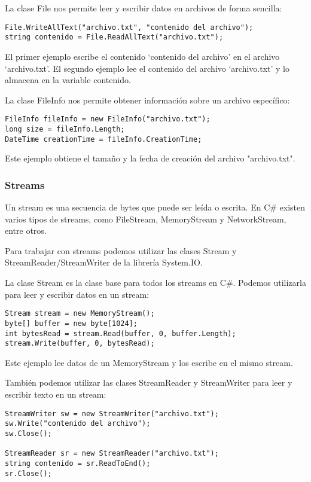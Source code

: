 \documentclass[executivepaper]{article}
\begin{document}
La clase File nos permite leer y escribir datos en archivos de forma sencilla:

\begin{lstlisting}
File.WriteAllText("archivo.txt", "contenido del archivo");
string contenido = File.ReadAllText("archivo.txt");
\end{lstlisting}

El primer ejemplo escribe el contenido \enquote*{contenido del archivo} en el archivo \enquote*{archivo.txt}. El segundo ejemplo lee el contenido del archivo \enquote*{archivo.txt} y lo almacena en la variable contenido.

La clase FileInfo nos permite obtener información sobre un archivo específico:

\begin{lstlisting}
FileInfo fileInfo = new FileInfo("archivo.txt");
long size = fileInfo.Length;
DateTime creationTime = fileInfo.CreationTime;
\end{lstlisting}

Este ejemplo obtiene el tamaño y la fecha de creación del archivo "archivo.txt".

\subsubsection*{Streams}
Un stream es una secuencia de bytes que puede ser leída o escrita. En C\# existen varios tipos de streams, como FileStream, MemoryStream y NetworkStream, entre otros.

Para trabajar con streams podemos utilizar las clases Stream y StreamReader/StreamWriter de la librería System.IO.

La clase Stream es la clase base para todos los streams en C\#. Podemos utilizarla para leer y escribir datos en un stream:

\begin{lstlisting}
Stream stream = new MemoryStream();
byte[] buffer = new byte[1024];
int bytesRead = stream.Read(buffer, 0, buffer.Length);
stream.Write(buffer, 0, bytesRead);
\end{lstlisting}

Este ejemplo lee datos de un MemoryStream y los escribe en el mismo stream.

También podemos utilizar las clases StreamReader y StreamWriter para leer y escribir texto en un stream:

\begin{lstlisting}
StreamWriter sw = new StreamWriter("archivo.txt");
sw.Write("contenido del archivo");
sw.Close();

StreamReader sr = new StreamReader("archivo.txt");
string contenido = sr.ReadToEnd();
sr.Close();
\end{lstlisting}
\end{document}
